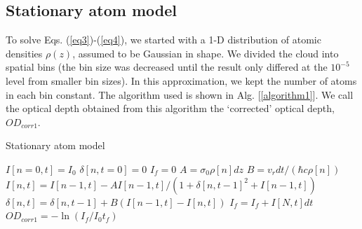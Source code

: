 \documentclass[12pt]{iopart}
\begin{document}
\subsection{Stationary atom model}
To solve Eqs. (\ref{eq3})-(\ref{eq4}), we started with a 1-D distribution of atomic densities $\rho(z)$, assumed to be Gaussian in shape. We divided the cloud into spatial bins (the bin size was decreased until the result only differed at the $10^{-5}$ level from smaller bin sizes).  In this approximation, we kept the number of atoms in each bin constant.  The algorithm used is shown in Alg. [\ref{algorithm1}]. We call the optical depth obtained from this algorithm the `corrected' optical depth, $OD_{corr1}$.

\begin{algorithm}
\caption{Stationary atom model}
\label{algorithm1}
\begin{algorithmic}
\STATE $I[n=0,t]=I_0$  
\STATE $\delta[n, t=0]=0$ 
\STATE $I_f=0$ 
 \STATE $A=\sigma_0\rho[n] dz$ 
 \STATE $B=v_r dt/(\hbar c \rho[n])$  
\STATE $I[n,t]=I[n-1,t] - A I[n-1,t]/(1+\delta[n,t-1]^2+I[n-1,t])$  
\STATE $\delta[n,t]=\delta[n,t-1]+B\left(I[n-1,t]-I[n,t]\right)$   
\ENDFOR 
\STATE $I_f =I_f+ I[N,t]dt$ 
\ENDFOR
\STATE $OD_{corr1}=-\ln{(I_f/I_0t_f)}$
\end{algorithmic}
\end{algorithm}
\end{document}
